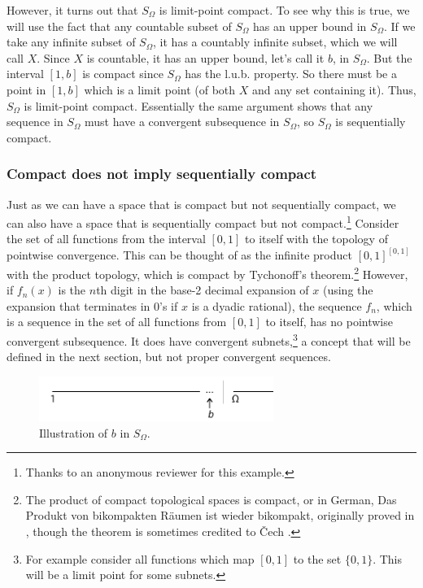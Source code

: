 \documentclass[12pt]{article}
\begin{document}
However, it turns out that $S_\Omega$  is limit-point compact.  To see why this is
true, we will use the fact that any countable subset of $S_\Omega$ has an upper bound
in $S_\Omega$.  If we take any infinite subset of $S_\Omega$, it has a
countably infinite subset, which we will call $X$.  Since $X$ is countable, it has an
upper bound, let's call it $b$, in $S_\Omega$.  But the interval $[1,b]$  is compact since $S_\Omega$  has the l.u.b. property.  So there must be  a point in $[1,b]$  which is a limit point (of both $X$  and any set containing it).  Thus,  $S_\Omega$ is limit-point compact.  Essentially the same
argument shows that any sequence in $S_\Omega$  must have a convergent subsequence in
$S_\Omega$, so $S_\Omega$ is sequentially compact.

\subsubsection{Compact does not imply sequentially compact}
Just as we can have a space that is compact but not sequentially compact, we can also
have a space that is sequentially compact but not compact.\footnote{Thanks to an anonymous
reviewer for this example.} Consider the set of all functions from the interval $[0,1]$ to itself with 
the topology of pointwise convergence. This can be thought of as the infinite product $[0,1]^{[0,1]}$ 
with the product topology, which is compact by Tychonoff's theorem.\footnote{The product of compact
topological spaces is compact, or in German, Das Produkt von bikompakten R\"{a}umen ist wieder bikompakt, originally proved in \cite[p. 772]{tych}, though the theorem is sometimes credited to \v{C}ech \cite{foll}.} However, if $f_n(x)$ is the $n$th digit in the base-2 decimal expansion of $x$ (using the expansion that terminates in 0's if $x$ is a dyadic rational),
the sequence $f_n$, which is a sequence in the set of all functions from $[0,1]$ to itself, has no pointwise
convergent subsequence. It does have convergent subnets,\footnote{For example consider all functions which
map $[0,1]$ to the set $\{ 0,1 \}$. This will be a limit point for some subnets.} a concept that will be defined in the next section,
but not proper convergent sequences. 

\begin{figure}[h]
\label{fig6}
  \begin{center}
   \includegraphics[width=3in]{binsomega.pdf}
  \end{center}
  \caption{Illustration of $b$ in $S_\Omega$.}
  \end{figure}
\end{document}
